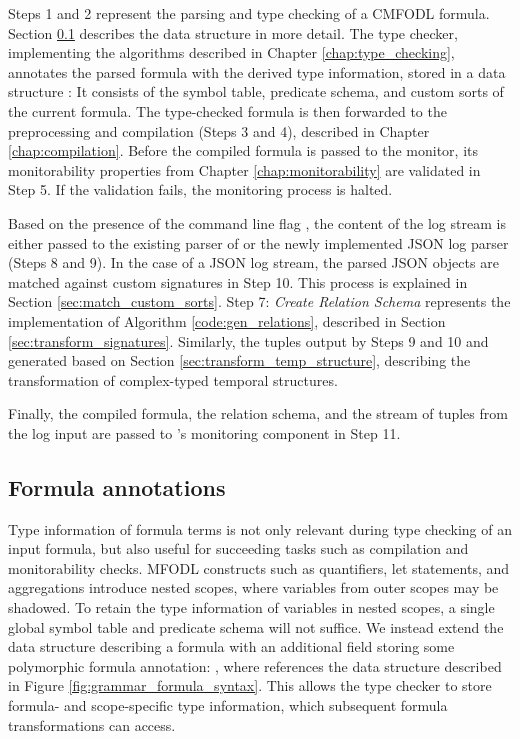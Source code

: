 Steps 1 and 2 represent the parsing and type checking of a CMFODL formula. Section \ref{sec:formula_annotations} describes the data structure  in more detail. The type checker, implementing the algorithms described in Chapter \ref{chap:type_checking}, annotates the parsed formula with the derived type information, stored in a data structure : It consists of the symbol table, predicate schema, and custom sorts of the current formula. The type-checked formula is then forwarded to the preprocessing and compilation (Steps 3 and 4), described in Chapter \ref{chap:compilation}. Before the compiled formula is passed to the \MonPoly monitor, its monitorability properties from Chapter \ref{chap:monitorability} are validated in Step 5. If the validation fails, the monitoring process is halted.

Based on the presence of the command line flag , the content of the log stream is either passed to the existing parser of \MonPoly or the newly implemented JSON log parser (Steps 8 and 9). In the case of a JSON log stream, the parsed JSON objects are matched against custom signatures in Step 10. This process is explained in Section \ref{sec:match_custom_sorts}. Step 7: \textit{Create Relation Schema} represents the implementation of Algorithm \ref{code:gen_relations}, described in Section \ref{sec:transform_signatures}. Similarly, the tuples output by Steps 9 and 10 and generated based on Section \ref{sec:transform_temp_structure}, describing the transformation of complex-typed temporal structures.

Finally, the compiled formula, the relation schema, and the stream of tuples from the log input are passed to \MonPoly's monitoring component in Step 11.


\subsection{Formula annotations}
\label{sec:formula_annotations}
Type information of formula terms is not only relevant during type checking of an input formula, but also useful for succeeding tasks such as compilation and monitorability checks. MFODL constructs such as quantifiers, let statements, and aggregations introduce nested scopes, where variables from outer scopes may be shadowed. To retain the type information of variables in nested scopes, a single global symbol table and predicate schema will not suffice. We instead extend the data structure describing a formula with an additional field storing some polymorphic formula annotation: , where  references the data structure described in Figure \ref{fig:grammar_formula_syntax}. This allows the type checker to store formula- and scope-specific type information, which subsequent formula transformations can access.

